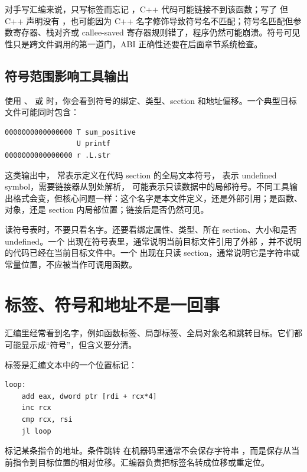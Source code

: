 对手写汇编来说，只写标签而忘记 ，C++ 代码可能链接不到该函数；写了  但 C++ 声明没有 ，也可能因为 C++ 名字修饰导致符号名不匹配；符号名匹配但参数寄存器、栈对齐或 callee-saved 寄存器规则错了，程序仍然可能崩溃。符号可见性只是跨文件调用的第一道门，ABI 正确性还要在后面章节系统检查。

\subsection{符号范围影响工具输出}

使用 、 或  时，你会看到符号的绑定、类型、section 和地址偏移。一个典型目标文件可能同时包含：

\begin{lstlisting}
0000000000000000 T sum_positive
                 U printf
0000000000000000 r .L.str
\end{lstlisting}

这类输出中， 常表示定义在代码 section 的全局文本符号， 表示 undefined symbol，需要链接器从别处解析， 可能表示只读数据中的局部符号。不同工具输出格式会变，但核心问题一样：这个名字是本文件定义，还是外部引用；是函数、对象，还是 section 内局部位置；链接后是否仍然可见。

读符号表时，不要只看名字。还要看绑定属性、类型、所在 section、大小和是否 undefined。一个  出现在符号表里，通常说明当前目标文件引用了外部 ，并不说明  的代码已经在当前目标文件中。一个  出现在只读 section，通常说明它是字符串或常量位置，不应被当作可调用函数。

\section{标签、符号和地址不是一回事}

汇编里经常看到名字，例如函数标签、局部标签、全局对象名和跳转目标。它们都可能显示成“符号”，但含义要分清。

标签是汇编文本中的一个位置标记：

\begin{lstlisting}
loop:
    add eax, dword ptr [rdi + rcx*4]
    inc rcx
    cmp rcx, rsi
    jl loop
\end{lstlisting}

 标记某条指令的地址。条件跳转  在机器码里通常不会保存字符串 ，而是保存从当前指令到目标位置的相对位移。汇编器负责把标签名转成位移或重定位。

